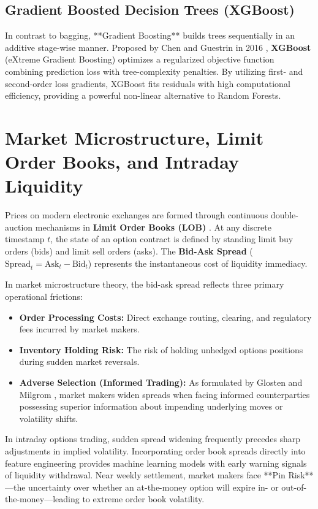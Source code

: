 \subsection{Gradient Boosted Decision Trees (XGBoost)}
In contrast to bagging, **Gradient Boosting** builds trees sequentially in an additive stage-wise manner. Proposed by Chen and Guestrin in 2016 \cite{chen2016xgboost}, \textbf{XGBoost} (eXtreme Gradient Boosting) optimizes a regularized objective function combining prediction loss with tree-complexity penalties. By utilizing first- and second-order loss gradients, XGBoost fits residuals with high computational efficiency, providing a powerful non-linear alternative to Random Forests.

\section{Market Microstructure, Limit Order Books, and Intraday Liquidity}
\label{sec:market_microstructure}

Prices on modern electronic exchanges are formed through continuous double-auction mechanisms in \textbf{Limit Order Books (LOB)} \cite{hasbrouck2007empirical, bouchaud2003theory}. At any discrete timestamp $t$, the state of an option contract is defined by standing limit buy orders (bids) and limit sell orders (asks). The \textbf{Bid-Ask Spread} ($\text{Spread}_t = \text{Ask}_t - \text{Bid}_t$) represents the instantaneous cost of liquidity immediacy.

In market microstructure theory, the bid-ask spread reflects three primary operational frictions:
\begin{itemize}\setlength{\itemsep}{0pt}\setlength{\parskip}{0pt}
    \item \textbf{Order Processing Costs:} Direct exchange routing, clearing, and regulatory fees incurred by market makers.
    \item \textbf{Inventory Holding Risk:} The risk of holding unhedged options positions during sudden market reversals.
    \item \textbf{Adverse Selection (Informed Trading):} As formulated by Glosten and Milgrom \cite{glosten1985bid}, market makers widen spreads when facing informed counterparties possessing superior information about impending underlying moves or volatility shifts.
\end{itemize}
In intraday options trading, sudden spread widening frequently precedes sharp adjustments in implied volatility. Incorporating order book spreads directly into feature engineering provides machine learning models with early warning signals of liquidity withdrawal. Near weekly settlement, market makers face **Pin Risk**—the uncertainty over whether an at-the-money option will expire in- or out-of-the-money—leading to extreme order book volatility.


